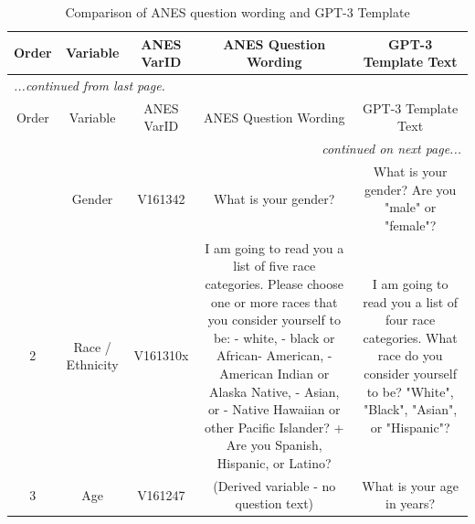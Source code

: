 \documentclass[11pt]{article}
\begin{document}
\begin{longtable}{ccccc}
    \caption{Comparison of ANES question wording and GPT-3 Template} \\
    \hline
    Order & Variable & ANES VarID & ANES Question Wording & GPT-3 Template Text\\
    \hline
    \endfirsthead

    \multicolumn{5}{l}{\textit{...continued from last page.}}\\
    \hline
    Order & Variable & ANES VarID & ANES Question Wording & GPT-3 Template Text\\
    \hline
    \endhead

    \hline
    \multicolumn{5}{r}{\textit{continued on next page...}}\\
    \endfoot

    \hline
    \endlastfoot


    \multirow{3}{2em}{1} & \multirow{3}{4.5em}{Gender} & \multirow{3}{4em}{V161342} & \multirow{3}{12em}{What is your gender?} & \multirow{3}{12em}{What is your gender? Are you "male" or "female"?}\\&&&&\\&&&&\\
    \hline

    \multirow{14}{2em}{2} & \multirow{14}{4.5em}{Race / Ethnicity} & \multirow{14}{4em}{V161310x} & \multirow{14}{12em}{I am going to read you a list of five race categories. Please choose one or more races that you consider yourself to be: - white, - black or African- American, - American Indian or Alaska Native, - Asian, or - Native Hawaiian or other Pacific Islander? + Are you Spanish, Hispanic, or Latino?} & \multirow{14}{12em}{I am going to read you a list of four race categories. What race do you consider yourself to be? "White", "Black", "Asian", or "Hispanic"?}\\&&&&\\&&&&\\&&&&\\&&&&\\&&&&\\&&&&\\&&&&\\&&&&\\&&&&\\&&&&\\&&&&\\&&&&\\&&&&\\
    \hline

    \multirow{3}{2em}{3} & \multirow{3}{4.5em}{Age} & \multirow{3}{4em}{V161247} & \multirow{3}{12em}{(Derived variable - no question text)} & \multirow{3}{12em}{What is your age in years?}\\&&&&\\&&&&\\
    \hline


\end{longtable}
\end{document}
